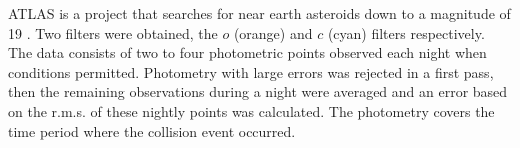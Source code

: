 \documentclass[sn-nature]{sn-jnl}%
\newcommand*\arcmin{\ensuremath{^\prime}}
\newcommand*\arcsec{\ensuremath{^{\prime\prime}}}
\begin{document}

ATLAS is a project that searches for near earth asteroids down to a magnitude of 19 \cite{Tonry18}.
%
Two filters were obtained, the $o$ (orange) and $c$ (cyan) filters respectively.
%
The data consists of two to four photometric points observed each night when conditions permitted.
%
Photometry with large errors was rejected in a first pass, then the remaining observations during a night were averaged and an error based on the r.m.s. of these nightly points was calculated.
%
The photometry covers the time period where the collision event occurred. 



\end{document}
